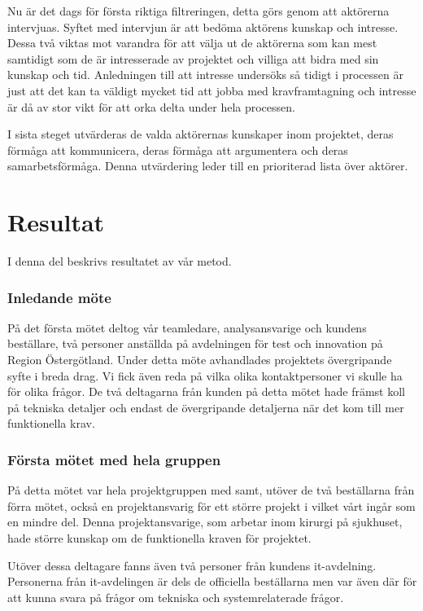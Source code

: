Nu är det dags för första riktiga filtreringen, detta görs genom att aktörerna intervjuas. Syftet med intervjun är att bedöma aktörens kunskap och intresse. Dessa två viktas mot varandra för att välja ut de aktörerna som kan mest samtidigt som de är intresserade av projektet och villiga att bidra med sin kunskap och tid. Anledningen till att intresse undersöks så tidigt i processen är just att det kan ta väldigt mycket tid att jobba med kravframtagning och intresse är då av stor vikt för att orka delta under hela processen.

I sista steget utvärderas de valda aktörernas kunskaper inom projektet, deras förmåga att kommunicera, deras förmåga att argumentera och deras samarbetsförmåga. Denna utvärdering leder till en prioriterad lista över aktörer.

\section{Resultat}
I denna del beskrivs resultatet av vår metod.

\subsubsection{Inledande möte}
På det första mötet deltog vår teamledare, analysansvarige och kundens beställare, två personer anställda på avdelningen för test och innovation på Region Östergötland. Under detta möte avhandlades projektets övergripande syfte i breda drag.
Vi fick även reda på vilka olika kontaktpersoner vi skulle ha för olika frågor. De två deltagarna från kunden på detta mötet hade främst koll på tekniska detaljer och endast de övergripande detaljerna när det kom till mer funktionella krav.

\subsubsection{Första mötet med hela gruppen}
På detta mötet var hela projektgruppen med samt, utöver de två beställarna från förra mötet, också en projektansvarig för ett större projekt i vilket vårt ingår som en mindre del. Denna projektansvarige, som arbetar inom kirurgi på sjukhuset, hade större kunskap om de funktionella kraven för projektet.

Utöver dessa deltagare fanns även två personer från kundens it-avdelning. Personerna från it-avdelingen är dels de officiella beställarna men var även där för att kunna svara på frågor om tekniska och systemrelaterade frågor.

